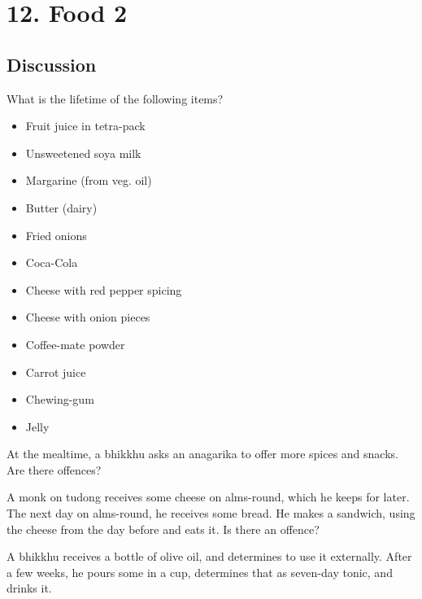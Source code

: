 \chapter{12. Food 2}
\renewcommand*{\theChapterTitle}{12. Food 2}

\section*{Discussion}

What is the lifetime of the following items?

\bigskip

\begin{multicols}{2}

\begin{itemize}

\item Fruit juice in tetra-pack
\item Unsweetened soya milk
\item Margarine (from veg. oil)
\item Butter (dairy)
\item Fried onions
\item Coca-Cola

\columnbreak

\item Cheese with red pepper spicing
\item Cheese with onion pieces
\item Coffee-mate powder
\item Carrot juice
\item Chewing-gum
\item Jelly

\end{itemize}

\end{multicols}

\bigskip

At the mealtime, a bhikkhu asks an anagarika to offer more spices and snacks.
Are there offences?

\bigskip

A monk on tudong receives some cheese on alms-round, which he keeps for later.
The next day on alms-round, he receives some bread. He makes a sandwich, using
the cheese from the day before and eats it. Is there an offence?

\bigskip

A bhikkhu receives a bottle of olive oil, and determines to use it externally.
After a few weeks, he pours some in a cup, determines that as seven-day tonic,
and drinks it.


